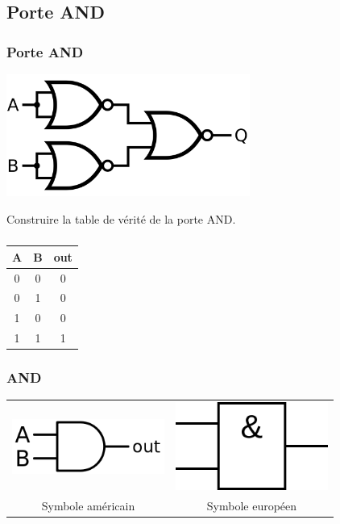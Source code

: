 \documentclass[svgnames,11pt]{beamer}
\begin{document}
\subsection{Porte AND}
\begin{frame}
    \frametitle{Porte AND}

    \begin{center}
        \centering
        \includegraphics[width=8cm]{ressources/and-from-nor.png}
    \end{center}
    \begin{activite}
        Construire la table de vérité de la porte AND.
    \end{activite}
\end{frame}
\begin{frame}
    \frametitle{}
    \begin{center}
        \begin{tabular}{|c|c|c|}
            \hline
            A & B & out \\
            \hline
            0 & 0 & 0   \\
            \hline
            0 & 1 & 0   \\
            \hline
            1 & 0 & 0   \\
            \hline
            1 & 1 & 1   \\
            \hline
        \end{tabular}
    \end{center}

\end{frame}
\begin{frame}
    \frametitle{AND}
    \begin{tabular}{cc}
        \includegraphics[width=5cm]{ressources/and-us.png}
                          &
        \includegraphics[width=5cm]{ressources/and-eu.png}
        \\
        Symbole américain & Symbole européen \\
    \end{tabular}


\end{frame}
\end{document}
